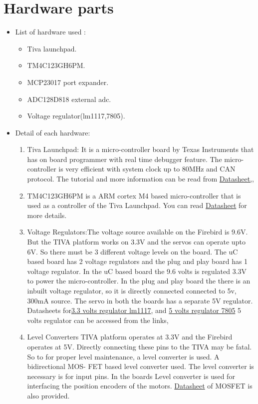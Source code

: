 \documentclass[a4paper,12pt,oneside]{book}
\begin{document}
\section{Hardware parts}
\begin{itemize}
  \item List of hardware used :
  \begin{itemize}
  	\item Tiva launchpad. 
  	\item TM4C123GH6PM.
  	\item MCP23017 port expander.
  	\item ADC128D818 external adc.
  	\item Voltage regulator(lm1117,7805).
  \end{itemize} 
  \item Detail of each hardware:
  \begin{enumerate}
  	\item Tiva Launchpad: It is a micro-controller  board by Texas Instruments that has on board programmer with real time debugger feature. The micro-controller is very efficient with system clock up to 80MHz and CAN protocol. The tutorial and more information can be
  read from \href{./datasheet/TIVALaunchpad.pdf}{Datasheet,}, 			
	\item TM4C123GH6PM is a ARM cortex M4 based micro-controller that is used as a controller of the Tiva Launchpad. You can read \href{./datasheet/tm4c123gh6pm.pdf}{Datasheet} for more details.
	
	\item Voltage Regulators:The voltage source available on the Firebird is 9.6V. But the TIVA platform works on 3.3V and the servos
	can operate upto 6V. So there must be 3 different voltage levels on the board. The uC based board has
	2 voltage regulators and the plug and play board has 1 voltage regulator. In the uC based board the
	9.6 volts is regulated 3.3V to power the micro-controller. In the plug and play board the there is an inbuilt voltage
	regulator, so it is directly connected connected to 5v, 300mA source. The servo in both the boards has a
	separate 5V regulator. Datasheets for\href{./datasheet/lm1117.pdf}{3.3 volts regulator lm1117}, and \href{./datasheet/LM7805.pdf}{ 5 volts regulator 7805} 5 volts regulator can be accessed from the links,
	
	\item Level Converters TIVA platform operates at 3.3V and the Firebird operates at 5V. Directly connecting these pins to
	the TIVA may be fatal. So to for proper level maintenance, a level converter is used. A bidirectional MOS-
	FET based level converter used. The level converter is necessary is for input pins. In the boards Level
	converter is used for interfacing the position encoders of the motors.
	\href{./datasheet/BSS138.pdf}{ Datasheet} of MOSFET is also provided.
	

\end{enumerate}
\end{itemize}
\end{document}
